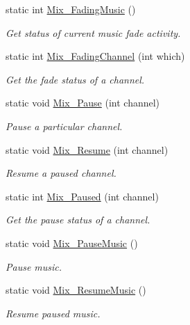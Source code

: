\begin{DoxyCompactItemize}
static int \hyperlink{namespace_tao_1_1_sdl_a78d03bb3f36bc9f89e98a2dd8248a613}{Mix\_\-FadingMusic} ()
\begin{DoxyCompactList}\small\item\em Get status of current music fade activity. \item\end{DoxyCompactList}\item 
static int \hyperlink{namespace_tao_1_1_sdl_a663eea2c0185c74a52c6ecba515210eb}{Mix\_\-FadingChannel} (int which)
\begin{DoxyCompactList}\small\item\em Get the fade status of a channel. \item\end{DoxyCompactList}\item 
static void \hyperlink{namespace_tao_1_1_sdl_abb714bc1510170e6495190e8bd128ad4}{Mix\_\-Pause} (int channel)
\begin{DoxyCompactList}\small\item\em Pause a particular channel. \item\end{DoxyCompactList}\item 
static void \hyperlink{namespace_tao_1_1_sdl_a9cefd15470fff5ab827caa2d3a0c086a}{Mix\_\-Resume} (int channel)
\begin{DoxyCompactList}\small\item\em Resume a paused channel. \item\end{DoxyCompactList}\item 
static int \hyperlink{namespace_tao_1_1_sdl_a7b542472ed1556bff8713216e4002499}{Mix\_\-Paused} (int channel)
\begin{DoxyCompactList}\small\item\em Get the pause status of a channel. \item\end{DoxyCompactList}\item 
static void \hyperlink{namespace_tao_1_1_sdl_aa0ef4670631ec6e222b47dd33e0036c6}{Mix\_\-PauseMusic} ()
\begin{DoxyCompactList}\small\item\em Pause music. \item\end{DoxyCompactList}\item 
static void \hyperlink{namespace_tao_1_1_sdl_a6a3adc0492d35aa660d1318a03fb3f6c}{Mix\_\-ResumeMusic} ()
\begin{DoxyCompactList}\small\item\em Resume paused music. \item\end{DoxyCompactList}\item 

\end{DoxyCompactItemize}
